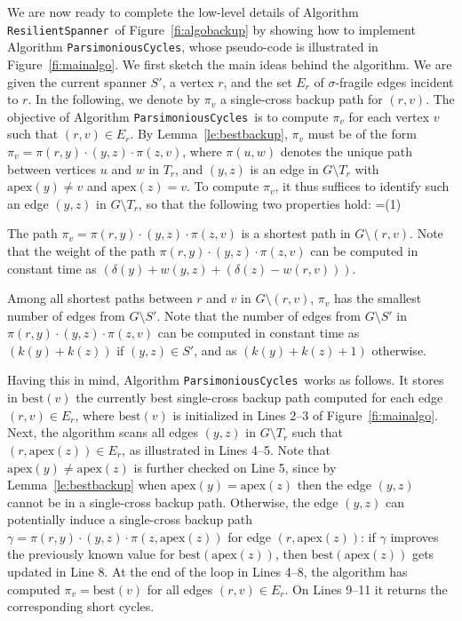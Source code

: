 \documentclass{article}
\newcommand{\apex}          {\mathrm{apex}}
\newcommand{\best}          {\mathrm{best}}
\newcommand{\ResilientSpanner}{\texttt{ResilientSpanner}}
\newcommand{\ParsimoniousCycles}{\texttt{ParsimoniousCycles}}
\newenvironment{mylist}[1]{
\setbox1=\hbox{#1}
\begin{list}{}{
\setlength{\labelwidth}{\wd1}
\setlength{\leftmargin}{\wd1}
\addtolength{\leftmargin}{0em}
\addtolength{\leftmargin}{\labelsep}
\setlength{\rightmargin}{1em}}}{\end{list}}
\newcommand{\litem}[1]{\item[#1\hfill]}
\begin{document}
We are now ready to complete the low-level details of Algorithm \ResilientSpanner\ of Figure~\ref{fi:algobackup}
by showing how to implement 
Algorithm  \ParsimoniousCycles, whose pseudo-code is illustrated in Figure~\ref{fi:mainalgo}. We first sketch the main ideas behind the algorithm. We are given the current spanner $S'$, a vertex $r$, and the set $E_r$ of $\sigma$-fragile edges incident to $r$. 
In the following, we denote  
by $\pi_v$ a single-cross backup path for $(r,v)$.
The objective of Algorithm  \ParsimoniousCycles\ is to  compute $\pi_v$ for each vertex $v$ such that $(r,v)\in E_r$.
By Lemma~\ref{le:bestbackup}, $\pi_v$ must be of the form
$\pi_v=\pi(r,y)\cdot (y,z)\cdot\pi(z,v)$, where $\pi(u,w)$ denotes the unique path between vertices $u$ and $w$ in $T_r$, and 
$(y,z)$ is an edge in $G\setminus T_r$ with  $\apex(y) \not= v$ and $\apex(z) = v$.
To compute $\pi_v$, 
 it thus suffices to identify such an edge $(y,z)$ in $G\setminus T_r$,  so that the 
following two properties hold:
\begin{mylist}{(1) }
\litem{(1)} The path $\pi_v=\pi(r,y)\cdot (y,z)\cdot\pi(z,v)$ is a shortest path in $G\setminus (r,v)$. Note that the weight of the path $\pi(r,y)\cdot (y,z)\cdot\pi(z,v)$ can be  computed in constant time as $(\delta(y)+w(y,z)+(\delta(z)-w(r,v)))$.
\litem{(2)} Among all shortest paths between $r$ and $v$ in $G\setminus (r,v)$, $\pi_v$ has the smallest number of edges from $G \setminus S'$. Note that the number of edges from $G \setminus S'$ in $\pi(r,y)\cdot (y,z)\cdot\pi(z,v)$ can be computed in constant time as $(k(y)+k(z))$ if $(y,z)\in S'$, and as $(k(y)+k(z)+1)$ otherwise.
\end{mylist}

Having this in mind, Algorithm \ParsimoniousCycles\ works
as follows. It stores in 
 $\best(v)$ the currently best single-cross backup path computed for each edge $(r,v)\in E_r$, where $\best(v)$ is initialized in Lines 2--3 of Figure~\ref{fi:mainalgo}.
 Next, the algorithm
scans all edges $(y,z)$ in $G\setminus T_r$
such that $(r,\apex(z))\in E_r$, as illustrated in Lines 4--5. Note that $\apex(y)\neq \apex(z)$ is further checked on Line 5, since by Lemma~\ref{le:bestbackup} when $\apex(y)=\apex(z)$ then the edge $(y,z)$ cannot be in a single-cross backup path. Otherwise, the edge $(y,z)$ can potentially induce a single-cross backup path $\gamma=\pi(r,y)\cdot (y,z)\cdot\pi(z,\apex(z))$ for edge $(r,\apex(z))$: if $\gamma$ improves the previously known value for $\best(\apex(z))$, then $\best(\apex(z))$ gets updated in Line 8. 
At the end of the loop in Lines 4--8, the algorithm has computed $\pi_v=\best(v)$ for all edges $(r,v)\in E_r$. On Lines 9--11 it returns the corresponding short cycles.
\end{document}
